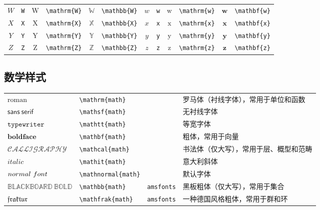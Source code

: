 \begin{table}[th]
\begin{tabular}{ c@{ }l c@{ }l c@{ }l c@{ }l c@{ }l c@{ }l}
		$W$ & \verb|W| & $\mathrm{W}$ & \verb|\mathrm{W}| & $\mathbb{W}$ & \verb|\mathbb{W}| & $w$ & \verb|w| & $\mathrm{w}$ & \verb|\mathrm{w}| & $\mathbf{w}$ & \verb|\mathbf{w}| \\
		$X$ & \verb|X| & $\mathrm{X}$ & \verb|\mathrm{X}| & $\mathbb{X}$ & \verb|\mathbb{X}| & $x$ & \verb|x| & $\mathrm{x}$ & \verb|\mathrm{x}| & $\mathbf{x}$ & \verb|\mathbf{x}| \\
		$Y$ & \verb|Y| & $\mathrm{Y}$ & \verb|\mathrm{Y}| & $\mathbb{Y}$ & \verb|\mathbb{Y}| & $y$ & \verb|y| & $\mathrm{y}$ & \verb|\mathrm{y}| & $\mathbf{y}$ & \verb|\mathbf{y}| \\
		$Z$ & \verb|Z| & $\mathrm{Z}$ & \verb|\mathrm{Z}| & $\mathbb{Z}$ & \verb|\mathbb{Z}| & $z$ & \verb|z| & $\mathrm{z}$ & \verb|\mathrm{z}| & $\mathbf{z}$ & \verb|\mathbf{z}| \\
		\hline
	\end{tabular}
\end{table}
%

\newpage
\subsection{数学样式}
%
\begin{table}[h]
	\centering
	\begin{tabular}{l l l l}
		\hline
		$\mathrm{roman}$            & \verb|\mathrm{|{\color{gray}\verb|math|}\verb|}|     &                 & 罗马体（衬线字体），常用于单位和函数 \\
		$\mathsf{sans\ serif}$      & \verb|\mathsf{|{\color{gray}\verb|math|}\verb|}|     &                 & 无衬线字体 \\
		$\mathtt{typewriter}$       & \verb|\mathtt{|{\color{gray}\verb|math|}\verb|}|     &                 & 等宽字体 \\
		$\mathbf{bold face}$        & \verb|\mathbf{|{\color{gray}\verb|math|}\verb|}|     &                 & 粗体，常用于向量 \\
		$\mathcal{CALLIGRAPHY}$     & \verb|\mathcal{|{\color{gray}\verb|math|}\verb|}|    &                 & 书法体（仅大写），常用于层、概型和范畴 \\
		$\mathit{italic}$           & \verb|\mathit{|{\color{gray}\verb|math|}\verb|}|     &                 & 意大利斜体 \\
		$\mathnormal{normal\ font}$ & \verb|\mathnormal{|{\color{gray}\verb|math|}\verb|}| &                 & 默认字体 \\
		\hline
		$\mathbb{BLACKBOARD\ BOLD}$ & \verb|\mathbb{|{\color{gray}\verb|math|}\verb|}|     & \verb|amsfonts| & 黑板粗体（仅大写），常用于集合 \\
		$\mathfrak{fraktur}$        & \verb|\mathfrak{|{\color{gray}\verb|math|}\verb|}|   & \verb|amsfonts| & 一种德国风格粗体，常用于群和环 \\
		\hline
	\end{tabular}
\end{table}
%

